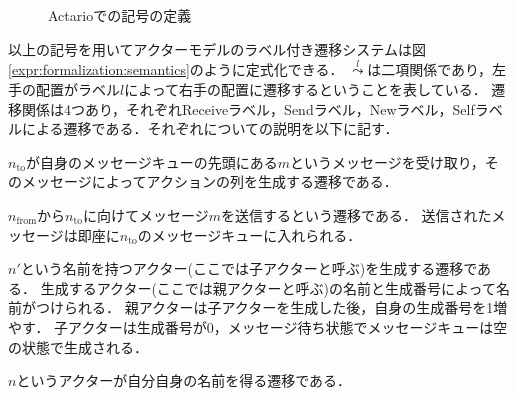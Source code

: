 \begin{figure}
  
  \label{code:formalization:config}
  \caption{Actarioでの記号の定義}
\end{figure}

以上の記号を用いてアクターモデルのラベル付き遷移システムは図\ref{expr:formalization:semantics}のように定式化できる．
$\overset{l}{\leadsto}$は二項関係であり，左手の配置がラベル$l$によって右手の配置に遷移するということを表している．
遷移関係は4つあり，それぞれ\textsf{Receive}ラベル，\textsf{Send}ラベル，\textsf{New}ラベル，\textsf{Self}ラベルによる遷移である．それぞれについての説明を以下に記す．

\begin{description}[style=nextline,leftmargin=12pt,parsep=0pt]
\item[$\textsf{Receive}(n_{\textrm{to}}, m)$]
  $n_{\textrm{to}}$が自身のメッセージキューの先頭にある$m$というメッセージを受け取り，そのメッセージによってアクションの列を生成する遷移である．
\item[$\textsf{Send}(n_{\textrm{from}}, n_{\textrm{to}}, m)$]
  $n_{\textrm{from}}$から$n_{\textrm{to}}$に向けてメッセージ$m$を送信するという遷移である．
  送信されたメッセージは即座に$n_{\textrm{to}}$のメッセージキューに入れられる．
\item[$\textsf{New}(n')$]
  $n'$という名前を持つアクター(ここでは子アクターと呼ぶ)を生成する遷移である．
  生成するアクター(ここでは親アクターと呼ぶ)の名前と生成番号によって名前がつけられる．
  親アクターは子アクターを生成した後，自身の生成番号を1増やす．
  子アクターは生成番号が0，メッセージ待ち状態でメッセージキューは空の状態で生成される．
\item[$\textsf{Self}(n)$]
  $n$というアクターが自分自身の名前を得る遷移である．
\end{description}


